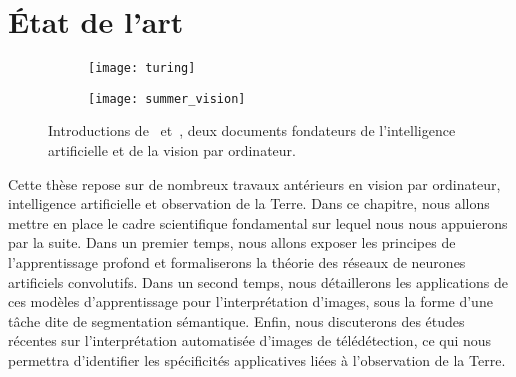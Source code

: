 \chapter{État de l'art}
\label{chap:etat}
\minitoc

\newpage

\begin{figure}[h]
  \begin{subfigure}{0.5\textwidth}
     \texttt{[image: turing]}
  \end{subfigure}
  \begin{subfigure}{0.5\textwidth}
     \texttt{[image: summer\_vision]}
  \end{subfigure}
  \caption[Introductions de \emph{Computing Machinery and Intelligence} (Turing, 1950) et \emph{Summer Vision Project} (Papert, 1966).]{Introductions de~\citet{turing_computing_1950} et~\citet{papert_summer_1966}, deux documents fondateurs de l'intelligence artificielle et de la vision par ordinateur.}
  \label{fig:introductions}
\end{figure}

Cette thèse repose sur de nombreux travaux antérieurs en vision par ordinateur, intelligence artificielle et observation de la Terre. Dans ce chapitre, nous allons mettre en place le cadre scientifique fondamental sur lequel nous nous appuierons par la suite. Dans un premier temps, nous allons exposer les principes de l'apprentissage profond et formaliserons la théorie des réseaux de neurones artificiels convolutifs. Dans un second temps, nous détaillerons les applications de ces modèles d'apprentissage pour l'interprétation d'images, sous la forme d'une tâche dite de segmentation sémantique. Enfin, nous discuterons des études récentes sur l'interprétation automatisée d'images de télédétection, ce qui nous permettra d'identifier les spécificités applicatives liées à l'observation de la Terre.

